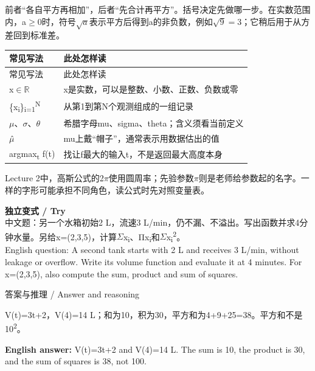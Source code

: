 前者“各自平方再相加”，后者“先合计再平方”。括号决定先做哪一步。在实数范围内，a\ensuremath{\ge}0时，符号\(\sqrt{a}\)表示平方后得到a的非负数，例如\(\sqrt{9}=3\)；它稍后用于从方差回到标准差。


\begingroup
\small\setlength{\tabcolsep}{3pt}
\renewcommand{\arraystretch}{1.22}
\begin{longtable}{@{}>{\raggedright\arraybackslash}p{}>{\raggedright\arraybackslash}p{}@{}}
\toprule
常见写法 & 此处怎样读 \\
\midrule\endfirsthead
常见写法 & 此处怎样读 \\
\midrule\endhead
\bottomrule\endfoot
x\ensuremath{\in}\ensuremath{\mathbb{R}} & x是实数，可以是整数、小数、正数、负数或零 \\
\{x\textsubscript{i}\}\textsubscript{i}\textsubscript{=}\textsubscript{1}\textsuperscript{N} & 从第1到第N个观测组成的一组记录 \\
\ensuremath{\mu}、\ensuremath{\sigma}、\ensuremath{\theta} & 希腊字母mu、sigma、theta；含义须看当前定义 \\
\ensuremath{\mu}̂ & mu上戴“帽子”，通常表示用数据估出的值 \\
argmax\textsubscript{t} f(t) & 找让f最大的输入t，不是返回最大高度本身 \\
\end{longtable}
\endgroup


Lecture 2中，高斯公式的2\ensuremath{\pi}使用圆周率；先验参数\ensuremath{\pi}则是老师给参数起的名字。一样的字形可能承担不同角色，读公式时先对照变量表。


\textbf{独立变式 / Try}\\

中文题：另一个水箱初始2 L，流速3 L/min，仍不漏、不溢出。写出函数并求4分钟水量。另给x=(2,3,5)，计算\ensuremath{\Sigma}x\textsubscript{i}、Πx\textsubscript{i}和\ensuremath{\Sigma}x\textsubscript{i}\textsuperscript{2}。\\

English question: A second tank starts with 2 L and receives 3 L/min, without leakage or overflow. Write its volume function and evaluate it at 4 minutes. For x=(2,3,5), also compute the sum, product and sum of squares.



\begin{StudySolution}{答案与推理 / Answer and reasoning}


V(t)=3t+2，V(4)=14 L；和为10，积为30，平方和为4+9+25=38。平方和不是10\textsuperscript{2}。

\textbf{English answer:} V(t)=3t+2 and V(4)=14 L. The sum is 10, the product is 30, and the sum of squares is 38, not 100.


\end{StudySolution}


